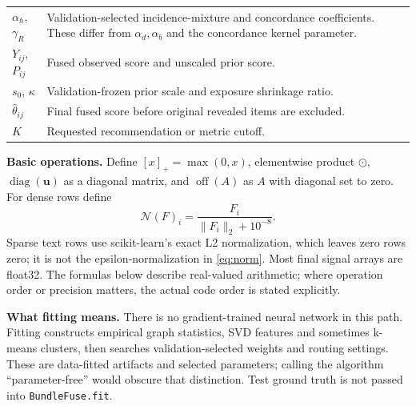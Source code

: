 \documentclass[11pt,a4paper]{article}
\newcommand{\code}[1]{\nolinkurl{#1}}
\newcommand{\diag}{\operatorname{diag}}
\newcommand{\off}{\operatorname{off}}
\newcommand{\normrows}{\mathcal N}
\numberwithin{equation}{section}
\begin{document}
\begin{longtable}{@{}>{\raggedright\arraybackslash}p{.21\linewidth}>{\raggedright\arraybackslash}p{.73\linewidth}@{}}
$\alpha_h$, $\gamma_R$ & Validation-selected incidence-mixture and concordance coefficients. These differ from $\alpha_d,\alpha_b$ and the concordance kernel parameter. \\
$Y_{ij}$, $P_{ij}$ & Fused observed score and unscaled prior score. \\
$s_0$, $\kappa$ & Validation-frozen prior scale and exposure shrinkage ratio. \\
$\widehat\theta_{ij}$ & Final fused score before original revealed items are excluded. \\
$K$ & Requested recommendation or metric cutoff. \\
\bottomrule
\end{longtable}

\textbf{Basic operations.} Define $[x]_+=\max(0,x)$, elementwise product $\odot$,
$\diag(\bm u)$ as a diagonal matrix, and $\off(A)$ as $A$ with diagonal set to zero.
For dense rows define
\begin{equation}\tag{N.1}\label{eq:norm}
 \normrows(F)_i=\frac{F_i}{\lVert F_i\rVert_2+10^{-8}}.
\end{equation}
Sparse text rows use scikit-learn's exact L2 normalization, which leaves zero rows zero;
it is not the epsilon-normalization in \eqref{eq:norm}. Most final signal arrays are float32.
The formulas below describe real-valued arithmetic; where operation order or precision
matters, the actual code order is stated explicitly.

\textbf{What fitting means.} There is no gradient-trained neural network in this path.
Fitting constructs empirical graph statistics, SVD features and sometimes k-means clusters,
then searches validation-selected weights and routing settings. These are data-fitted
artifacts and selected parameters; calling the algorithm ``parameter-free'' would obscure
that distinction. Test ground truth is not passed into \code{BundleFuse.fit}.
\end{document}
